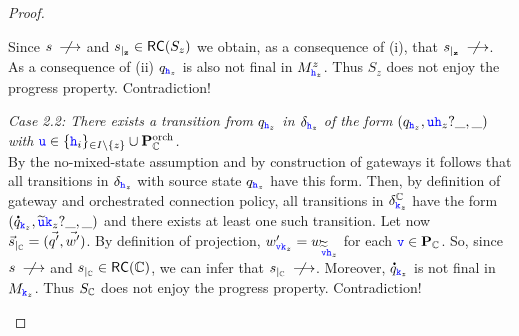 \begin{proof}
\begin{description}
\begin{description}
Since $s\notlts{}$ and $\restrict{s}{z}\in \RS(S_z)$ we obtain, as a consequence of (i), that $\restrict{s}{z}\notlts{}$. As a consequence of (ii) $q_{\HH_z}$ is also not final in $M^z_{\HH_z}$. 
Thus $S_z$ does not enjoy the progress property. Contradiction!
%
\item \emph{Case 2.2:
There exists a transition from $q_{\HH_z}$ in $\delta_{\HH_{z}}$ of the form
$(q_{\HH_z},\ttu\HH_z?\_,\_)$ with $\ttu\in\Set{\hh_i}_{ \in I\setminus\Set{z}}\cup\rolesorch_{\cs}$.}\\
By the no-mixed-state assumption and by construction of gateways
it follows that all transitions in $\delta_{\HH_{z}}$ with source state
$q_{\HH_z}$ have this form. 
Then, by definition of gateway and orchestrated connection policy, all transitions
in $\delta^{\cs}_{\KK_{z}}$ have the form
$(\dot{q}_{\KK_z},\widetilde{\ttu}\KK_z?\_,\_)$ and there exists at least one such
transition.
Let now $\restrict{\vec{s}}{\cs}= (\vec{q'},\vec{w'})$.
By definition of projection,
$w'_{\ttv\KK_{z}}=w_{\widetilde{\widetilde{\ttv}}\HH_{z}}$  for each $\ttv\in\roles_{\cs}$.
So, since  $s \notlts{}$ and $\restrict{s}{\cs}\in \RS(\cs)$, we can infer that $\restrict{s}{\cs}\notlts{}$.
Moreover, $\dot{q}_{\KK_z}$ is not final in $M_{\KK_z}$.
Thus $S_{\cs}$ does not enjoy the progress property. Contradiction!
\end{description}
\end{description}
 

\end{proof}
